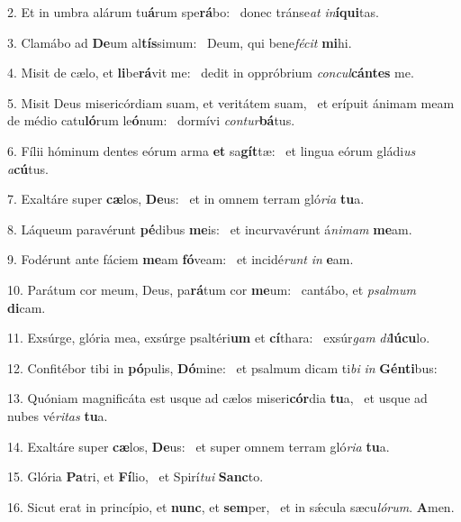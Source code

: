 2. Et in umbra alárum tu\textbf{á}rum spe\textbf{rá}bo: \ast\  donec tránse\textit{at} \textit{in}\textbf{í}\textbf{qui}tas.\

3. Clamábo ad \textbf{De}um al\textbf{tís}simum: \ast\  Deum, qui bene\textit{fé}\textit{cit} \textbf{mi}hi.\

4. Misit de cælo, et \textbf{li}be\textbf{rá}vit me: \ast\  dedit in oppróbrium \textit{con}\textit{cul}\textbf{cán}\textbf{tes} me.\

5. Misit Deus misericórdiam suam, et veritátem suam, \dag\  et erípuit ánimam meam de médio catu\textbf{ló}rum le\textbf{ó}num: \ast\  dormívi \textit{con}\textit{tur}\textbf{bá}tus.\

6. Fílii hóminum dentes eórum arma \textbf{et} sa\textbf{gít}tæ: \ast\  et lingua eórum gládi\textit{us} \textit{a}\textbf{cú}tus.\

7. Exaltáre super \textbf{cæ}los, \textbf{De}us: \ast\  et in omnem terram gló\textit{ri}\textit{a} \textbf{tu}a.\

8. Láqueum paravérunt \textbf{pé}dibus \textbf{me}is: \ast\  et incurvavérunt á\textit{ni}\textit{mam} \textbf{me}am.\

9. Fodérunt ante fáciem \textbf{me}am \textbf{fó}veam: \ast\  et incidé\textit{runt} \textit{in} \textbf{e}am.\

10. Parátum cor meum, Deus, pa\textbf{rá}tum cor \textbf{me}um: \ast\  cantábo, et \textit{psal}\textit{mum} \textbf{di}cam.\

11. Exsúrge, glória mea, exsúrge psaltéri\textbf{um} et \textbf{cí}thara: \ast\  exsúr\textit{gam} \textit{di}\textbf{lú}\textbf{cu}lo.\

12. Confitébor tibi in \textbf{pó}pulis, \textbf{Dó}mine: \ast\  et psalmum dicam ti\textit{bi} \textit{in} \textbf{Gén}\textbf{ti}bus:\

13. Quóniam magnificáta est usque ad cælos miseri\textbf{cór}dia \textbf{tu}a, \ast\  et usque ad nubes vé\textit{ri}\textit{tas} \textbf{tu}a.\

14. Exaltáre super \textbf{cæ}los, \textbf{De}us: \ast\  et super omnem terram gló\textit{ri}\textit{a} \textbf{tu}a.\

15. Glória \textbf{Pa}tri, et \textbf{Fí}lio, \ast\  et Spirí\textit{tu}\textit{i} \textbf{Sanc}to.\

16. Sicut erat in princípio, et \textbf{nunc}, et \textbf{sem}per, \ast\  et in sǽcula sæcu\textit{ló}\textit{rum}. \textbf{A}men.\

